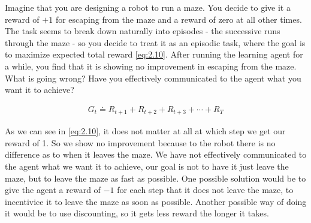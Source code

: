 \begin{exercise}
Imagine that you are designing a robot to run a maze.
You decide to give it a reward of $+1$ for escaping from the maze and a reward of zero at all other times.
The task seems to break down naturally into episodes - the successive runs through the maze - so you decide to treat it as an episodic task, where the goal is to maximize expected total reward \eqref{eq:2.10}.
After running the learning agent for a while, you find that it is showing no improvement in escaping from the maze.
What is going wrong?
Have you effectively communicated to the agent what you want it to achieve?

\begin{align} \label{eq:2.10}
    G_t \doteq R_{t+1} + R_{t+2} + R_{t+3} + \cdots + R_T
\end{align}
\end{exercise}

\begin{solution}
  As we can see in \eqref{eq:2.10}, it does not matter at all at which step we get our reward of 1. So we show no improvement because to the robot there is no difference as to when it leaves the maze. We have not effectively communicated to the agent what we want it to achieve, our goal is not to have it just leave the maze, but to leave the maze as fast as possible. One possible solution would be to give the agent a reward of $-1$ for each step that it does not leave the maze, to incentivice it to leave the maze as soon as possible. Another possible way of doing it would be to use discounting, so it gets less reward the longer it takes. 
  \end{solution}
